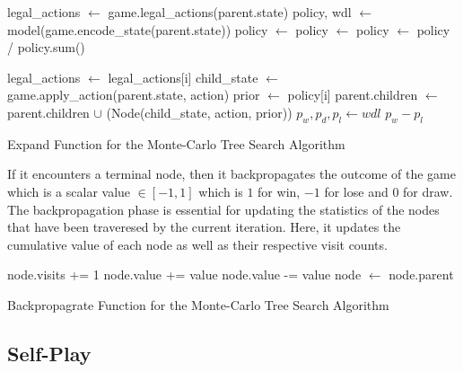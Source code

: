 \begin{algorithm}[htb]
    \begin{algorithmic}[1]
            \State legal\_actions $\gets$ game.legal\_actions(parent.state)
            \State policy, wdl $\gets$ model(game.encode\_state(parent.state))
            \State policy $\gets$ 
            \State policy $\gets$ 
            \State policy $\gets$ policy / policy.sum()
        
                \State legal\_actions $\gets$ legal\_actions[i]
                \State child\_state $\gets$ game.apply\_action(parent.state, action)
                \State prior $\gets$ policy[i]
                \State parent.children $\gets$ parent.children $\cup$ (Node(child\_state, action, prior))
            \EndFor
            \State $p_w, p_d, p_l \gets wdl$ 
            \State \Return $p_w - p_l$
        \EndFunction
    \end{algorithmic}
    \caption{Expand Function for the Monte-Carlo Tree Search Algorithm}
    \label{alg:expand}
\end{algorithm}

If it encounters a terminal node, then it backpropagates the outcome of the game which is a scalar value $\in [-1, 1]$ which is $1$ for win, $-1$ for lose and $0$ for draw. The backpropagation phase is essential for updating the statistics of the nodes that have been traveresed by the current iteration. Here, it updates the cumulative value of each node as well as their respective visit counts.

\begin{algorithm}[htb]
    \begin{algorithmic}[1]
                \State node.visits += 1
                    \State node.value += value
                \Else
                    \State node.value -= value
                \EndIf
                \State node $\gets$ node.parent
            \EndWhile
        \EndFunction
    \end{algorithmic}
    \caption{Backpropagrate Function for the Monte-Carlo Tree Search Algorithm}
    \label{alg:backpropagate}
\end{algorithm}


\subsection{Self-Play}

